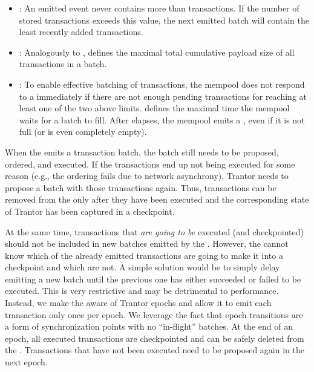 \documentclass{article}
\begin{document}
\begin{itemize}
    
    \item {}: An emitted  event never contains more than  transactions.
    If the number of stored transactions exceeds this value, the next emitted batch will contain the  least recently added transactions.
    
    \item {}: Analogously to ,
     defines the maximal total cumulative payload size of all transactions in a batch.
    
    \item {}: To enable effective batching of transactions, the mempool does not respond to a  immediately
    if there are not enough pending transactions for reaching at least one of the two above limits.
     defines the maximal time the mempool waits for a batch to fill.
    After  elapses, the mempool emits a , even if it is not full (or is even completely empty).
\end{itemize}

When the  emits a transaction batch, the batch still needs to be proposed, ordered, and executed.
If the transactions end up not being executed for some reason (e.g., the ordering fails due to network asynchrony),
Trantor needs to propose a batch with those transactions again.
Thus, transactions can be removed from the  only after they have been executed
and the corresponding state of Trantor has been captured in a checkpoint.

At the same time, transactions that \emph{are going to be} executed (and checkpointed) should not be included in new batches emitted by the .
However, the  cannot know which of the already emitted transactions are going to make it into a checkpoint and which are not.
A simple solution would be to simply delay emitting a new batch until the previous one has either succeeded or failed to be executed.
This is very restrictive and may be detrimental to performance.
Instead, we make the  aware of Trantor epochs and allow it to emit each transaction only once per epoch.
We leverage the fact that epoch transitions are a form of synchronization points with no ``in-flight'' batches.
At the end of an epoch, all executed transactions are checkpointed and can be safely deleted from the .
Transactions that have not been executed need to be proposed again in the next epoch.
\end{document}
